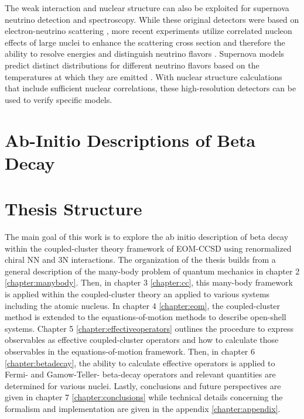 \documentclass[../thesis.tex]{subfiles}
\begin{document}
The weak interaction and nuclear structure can also be exploited for supernova neutrino detection and spectroscopy. While these original detectors were based on electron-neutrino scattering \cite{HIRATA19871490,BIONTA19871494}, more recent experiments utilize correlated nucleon effects of large nuclei to enhance the scattering cross section and therefore the ability to resolve energies and distinguish neutrino flavors \cite{HARGROVE1996183,CLINE1994720,EWAN1992373,LANGANKE19962629}. Supernova models predict distinct distributions for different neutrino flavors based on the temperatures at which they are emitted \cite{KOLBE20032569,BENHAR2005053005}. With nuclear structure calculations that include sufficient nuclear correlations, these high-resolution detectors can be used to verify specific models.



\section{Ab-Initio Descriptions of Beta Decay}



\section{Thesis Structure}

The main goal of this work is to explore the ab initio description of beta decay within the coupled-cluster theory framework of EOM-CCSD using renormalized chiral NN and 3N interactions.  The organization of the thesis builds from a general description of the many-body problem of quantum mechanics in chapter 2 \ref{chapter:manybody}. Then, in chapter 3 \ref{chapter:cc}, this many-body framework is applied within the coupled-cluster theory an applied to various systems including the atomic nucleus. In chapter 4 \ref{chapter:eom}, the coupled-cluster method is extended to the equations-of-motion methods to describe open-shell systems. Chapter 5 \ref{chapter:effectiveoperators} outlines the procedure to express observables as effective coupled-cluster operators and how to calculate those observables in the equations-of-motion framework.  Then, in chapter 6 \ref{chapter:betadecay}, the ability to calculate effective operators is applied to Fermi- and Gamow-Teller- beta-decay operators and relevant quantities are determined for various nuclei. Lastly, conclusions and future perspectives are given in chapter 7 \ref{chapter:conclusions} while technical details concerning the formalism and implementation are given in the appendix \ref{chapter:appendix}.
\end{document}

